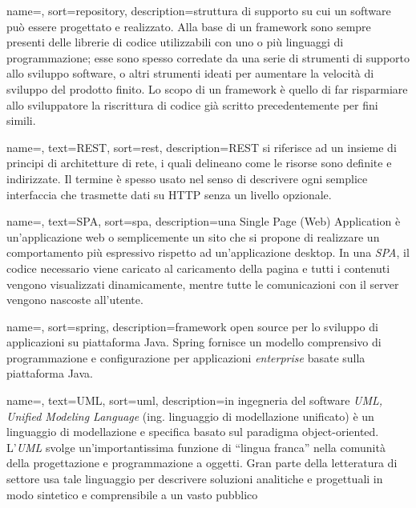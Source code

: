 
{
	name=,
	sort=repository,
	description={struttura di supporto su cui un software può essere progettato e realizzato. Alla base di un framework sono sempre presenti delle librerie di codice utilizzabili con uno o più linguaggi di programmazione; esse sono spesso corredate da una serie di strumenti di supporto allo sviluppo software, o altri strumenti ideati per aumentare la velocità di sviluppo del prodotto finito. Lo scopo di un framework è quello di far risparmiare allo sviluppatore la riscrittura di codice già scritto precedentemente per fini simili.}
}

{
	name=,
	text=REST,
	sort=rest,
	description={REST si riferisce ad un insieme di principi di architetture di rete, i quali delineano come le risorse sono definite e indirizzate. Il termine è spesso usato nel senso di descrivere ogni semplice interfaccia che trasmette dati su HTTP senza un livello opzionale.}
}

{
	name=,
	text=SPA,
	sort=spa,
	description={una Single Page (Web) Application è un'applicazione web o semplicemente un sito che si propone di realizzare un comportamento più espressivo rispetto ad un'applicazione desktop. In una \emph{SPA}, il codice necessario viene caricato al caricamento della pagina e tutti i contenuti vengono visualizzati dinamicamente, mentre tutte le comunicazioni con il server vengono nascoste all'utente.}
}

{
	name=,
	sort=spring,
	description={framework open source per lo sviluppo di applicazioni su piattaforma Java. Spring fornisce un modello comprensivo di programmazione e configurazione per applicazioni \emph{enterprise} basate sulla piattaforma Java.}
}
		
{
    name=,
    text=UML,
    sort=uml,
    description={in ingegneria del software \emph{UML, Unified Modeling Language} (ing. linguaggio di modellazione unificato) è un linguaggio di modellazione e specifica basato sul paradigma object-oriented. L'\emph{UML} svolge un'importantissima funzione di ``lingua franca'' nella comunità della progettazione e programmazione a oggetti. Gran parte della letteratura di settore usa tale linguaggio per descrivere soluzioni analitiche e progettuali in modo sintetico e comprensibile a un vasto pubblico}
}
